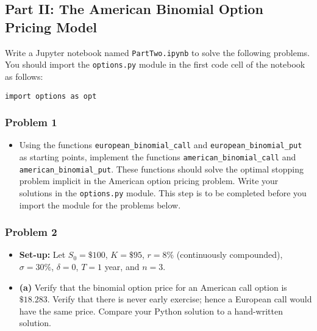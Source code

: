 \documentclass[
]{article}
\providecommand{\tightlist}{%
  \setlength{\itemsep}{0pt}\setlength{\parskip}{0pt}}
\begin{document}
\hypertarget{part-ii-the-american-binomial-option-pricing-model}{%
\subsection{\texorpdfstring{\textbf{Part II: The American Binomial
Option Pricing
Model}}{Part II: The American Binomial Option Pricing Model}}\label{part-ii-the-american-binomial-option-pricing-model}}

Write a Jupyter notebook named \texttt{PartTwo.ipynb} to solve the
following problems. You should import the \texttt{options.py} module in
the first code cell of the notebook as follows:

\begin{verbatim}
import options as opt
\end{verbatim}

\hypertarget{problem-1-1}{%
\subsubsection{\texorpdfstring{\textbf{Problem
1}}{Problem 1}}\label{problem-1-1}}

\begin{itemize}
\tightlist
\item
  Using the functions \texttt{european\_binomial\_call} and
  \texttt{european\_binomial\_put} as starting points, implement the
  functions \texttt{american\_binomial\_call} and
  \texttt{american\_binomial\_put}. These functions should solve the
  optimal stopping problem implicit in the American option pricing
  problem. Write your solutions in the \texttt{options.py} module. This
  step is to be completed before you import the module for the problems
  below.
\end{itemize}

\hypertarget{problem-2-1}{%
\subsubsection{\texorpdfstring{\textbf{Problem
2}}{Problem 2}}\label{problem-2-1}}

\begin{itemize}
\tightlist
\item
  \textbf{Set-up:} Let \(S_{0} = \$100\), \(K = \$95\), \(r = 8\%\)
  (continuously compounded), \(\sigma = 30\%\), \(\delta = 0\),
  \(T = 1\) year, and \(n = 3\).
\end{itemize}

\begin{itemize}
\tightlist
\item
  \textbf{(a)} Verify that the binomial option price for an American
  call option is \(\$18.283\). Verify that there is never early
  exercise; hence a European call would have the same price. Compare
  your Python solution to a hand-written solution.
\end{itemize}
\end{document}
